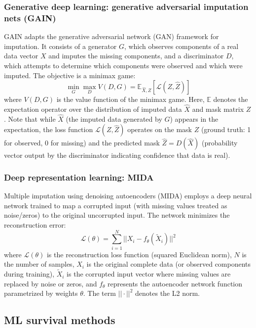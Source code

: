 \documentclass[pdflatex,sn-mathphys-num]{sn-jnl}%
\theoremstyle{thmstyleone}%
\theoremstyle{thmstyletwo}%
\theoremstyle{thmstylethree}%
\begin{document}
\subsubsection{Generative deep learning: generative adversarial imputation nets (GAIN)}
GAIN \cite{yoon2018gain} adapts the generative adversarial network (GAN) framework for imputation. It consists of a generator $G$, which observes components of a real data vector $X$ and imputes the missing components, and a discriminator $D$, which attempts to determine which components were observed and which were imputed. The objective is a minimax game:
\begin{equation}
\min_G \max_D V(D, G) = \mathbb{E}_{\hat{X}, Z}[\mathcal{L}(Z, \hat{Z})]
\end{equation}
where $V(D, G)$ is the value function of the minimax game. Here, $\mathbb{E}$ denotes the expectation operator over the distribution of imputed data $\hat{X}$ and mask matrix $Z$. Note that while $\hat{X}$ (the imputed data generated by $G$) appears in the expectation, the loss function $\mathcal{L}(Z, \hat{Z})$ operates on the mask $Z$ (ground truth: 1 for observed, 0 for missing) and the predicted mask $\hat{Z} = D(\hat{X})$ (probability vector output by the discriminator indicating confidence that data is real).

\subsubsection{Deep representation learning: MIDA}
Multiple imputation using denoising autoencoders (MIDA) \cite{gondara2018mida} employs a deep neural network trained to map a corrupted input (with missing values treated as noise/zeros) to the original uncorrupted input. The network minimizes the reconstruction error:
\begin{equation}
\mathcal{L}(\theta) = \sum_{i=1}^{N} ||X_i - f_{\theta}(\tilde{X}_i)||^2
\end{equation}
where $\mathcal{L}(\theta)$ is the reconstruction loss function (squared Euclidean norm), $N$ is the number of samples, $X_i$ is the original complete data (or observed components during training), $\tilde{X}_i$ is the corrupted input vector where missing values are replaced by noise or zeros, and $f_{\theta}$ represents the autoencoder network function parametrized by weights $\theta$. The term $|| \cdot ||^2$ denotes the L2 norm.

\subsection{ML survival methods}
\end{document}
